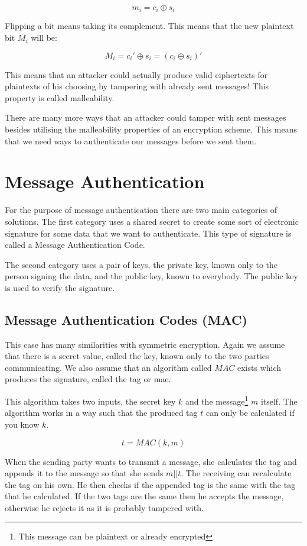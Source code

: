 \[
  m_i = c_i \oplus s_i
\]

Flipping a bit means taking its complement.
This means that the new plaintext bit $M_i$ will be:

\[
  M_i = c_i\prime \oplus s_i = (c_i \oplus s_i)\prime
\]

This means that an attacker could actually produce valid ciphertexts for plaintexts of his choosing by tampering with already sent messages!
This property is called malleability.

There are many more ways that an attacker could tamper with sent messages besides utilising the malleability properties of an encryption scheme.
This means that we need ways to authenticate our messages before we sent them.

\section{Message Authentication}

For the purpose of message authentication there are two main categories of solutions.
The first category uses a shared secret to create some sort of electronic signature for some data that we want to authenticate.
This type of signature is called a Message Authentication Code.

The second category uses a pair of keys, the private key, known only to the person signing the data, and the public key, known to everybody.
The public key is used to verify the signature.

\subsection{Message Authentication Codes (MAC)}

This case has many similarities with symmetric encryption.
Again we assume that there is a secret value, called the key, known only to the two parties communicating.
We also assume that an algorithm called $MAC$ exists which produces the signature, called the tag or mac.

This algorithm takes two inputs, the secret key $k$ and the message\footnote{This message can be plaintext or already encrypted} $m$ itself.
The algorithm works in a way such that the produced tag $t$ can only be calculated if you know $k$.

\[
  t = MAC(k, m)
\]

When the sending party wants to transmit a message, she calculates the tag and appends it to the message so that she sends $m||t$.
The receiving can recalculate the tag on his own.
He then checks if the appended tag is the same with the tag that he calculated.
If the two tags are the same then he accepts the message, otherwise he rejects it as it is probably tampered with.

